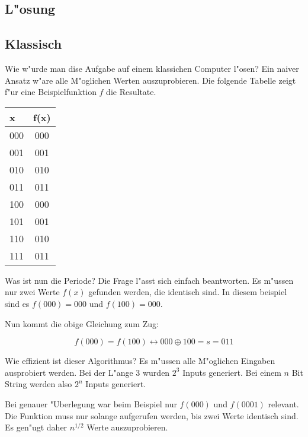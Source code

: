 \begin{refsection}
\section{L"osung}

\subsection{Klassisch}

Wie w"urde man dise Aufgabe auf einem klassichen Computer l"osen? Ein naiver
Ansatz w"are alle M"oglichen Werten auszuprobieren. Die folgende Tabelle zeigt
f"ur eine Beispielfunktion $f$ die Resultate.


\begin{center}
   \begin{tabular}{ l | c  }
    \hline
     x   & f(x) \\ \hline
     000 & 000  \\ \hline
     001 & 001  \\ \hline
     010 & 010  \\ \hline
     011 & 011  \\ \hline
     100 & 000  \\ \hline
     101 & 001  \\ \hline
     110 & 010  \\ \hline
     111 & 011  \\ \hline
     \hline
    \end{tabular}
\end{center}


Was ist nun die Periode? Die Frage l"asst sich einfach beantworten. Es m"ussen
nur zwei Werte $f(x)$ gefunden werden, die identisch sind. In diesem beispiel
sind es $f(000) = 000$ und $f(100) = 000$. 

Nun kommt die obige Gleichung zum Zug:

\[
    f(000) = f(100) \leftrightarrow 000 \oplus 100 = s = 011
\]

Wie effizient ist dieser Algorithmus? Es m"ussen alle M"oglichen Eingaben
ausprobiert werden. Bei der L"ange $3$ wurden $2^3$ Inputs generiert. Bei einem
$n$ Bit String werden also $2^n$ Inputs generiert. 

Bei genauer "Uberlegung war beim Beispiel nur $f(000)$ und $f(0001)$ relevant.
Die Funktion muss nur solange aufgerufen werden, bis zwei Werte identisch sind.
Es gen"ugt daher $n^{1/2}$ Werte auszuprobieren.



\end{refsection}
